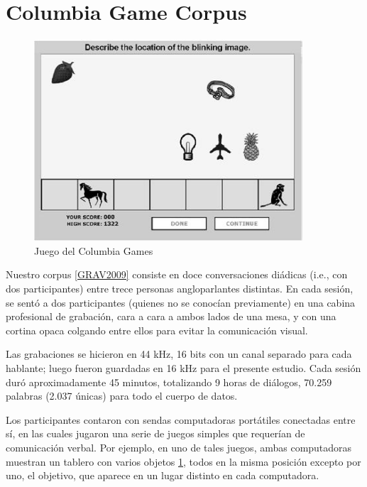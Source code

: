 \section{Columbia Game Corpus}

\begin{figure}
\centering
\includegraphics[width=10cm]{images/columbia_games.jpg}
\caption{Juego del Columbia Games}
\label{tablero_columbia_games}
\end{figure}

\newcommand{\cardgame} {\emph{Juego de cartas}}
\newcommand{\objectgame} {\emph{Juego de objetos}}


Nuestro corpus \ref{GRAV2009} consiste en doce conversaciones diádicas (i.e., con dos participantes) entre trece personas angloparlantes distintas. En cada sesión, se sentó a dos participantes (quienes no se conocían previamente) en una cabina profesional de grabación, cara a cara a ambos lados de una mesa, y con una cortina opaca colgando entre ellos para evitar la comunicación visual.


Las grabaciones se hicieron en 44 kHz, 16 bits con un canal separado para cada hablante; luego fueron guardadas en 16 kHz para el presente estudio. Cada sesión duró aproximadamente 45 minutos, totalizando 9 horas de diálogos, 70.259 palabras (2.037 únicas) para todo el cuerpo de datos.


Los participantes contaron con sendas computadoras portátiles conectadas entre sí, en las cuales jugaron una serie de juegos simples que requerían de comunicación verbal. Por ejemplo, en uno de tales juegos, ambas computadoras muestran un tablero con varios objetos \ref{tablero_columbia_games}, todos en la misma posición excepto por uno, el objetivo, que aparece en un lugar distinto en cada computadora.

